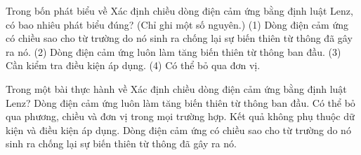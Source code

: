 \begin{ex}
Trong bốn phát biểu về Xác định chiều dòng điện cảm ứng bằng định luật Lenz, có bao nhiêu phát biểu đúng? (Chỉ ghi một số nguyên.) (1) Dòng điện cảm ứng có chiều sao cho từ trường do nó sinh ra chống lại sự biến thiên từ thông đã gây ra nó. (2) Dòng điện cảm ứng luôn làm tăng biến thiên từ thông ban đầu. (3) Cần kiểm tra điều kiện áp dụng. (4) Có thể bỏ qua đơn vị.
\end{ex}

\begin{ex}
Trong một bài thực hành về Xác định chiều dòng điện cảm ứng bằng định luật Lenz?
\choice
{Dòng điện cảm ứng luôn làm tăng biến thiên từ thông ban đầu.}
{Có thể bỏ qua phương, chiều và đơn vị trong mọi trường hợp.}
{Kết quả không phụ thuộc dữ kiện và điều kiện áp dụng.}
{\True Dòng điện cảm ứng có chiều sao cho từ trường do nó sinh ra chống lại sự biến thiên từ thông đã gây ra nó.}
\end{ex}

